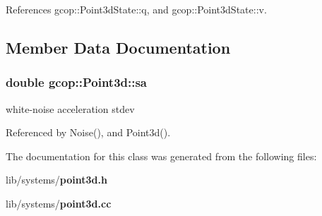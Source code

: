 \-References gcop\-::\-Point3d\-State\-::q, and gcop\-::\-Point3d\-State\-::v.



\subsection{\-Member \-Data \-Documentation}
\subsubsection[{sa}]{\setlength{\rightskip}{0pt plus 5cm}double {\bf gcop\-::\-Point3d\-::sa}}\label{classgcop_1_1Point3d_a5004631e9feecffc1882b02cdfe98a26}


white-\/noise acceleration stdev 



\-Referenced by \-Noise(), and \-Point3d().



\-The documentation for this class was generated from the following files\-:\begin{DoxyCompactItemize}
\item 
lib/systems/{\bf point3d.\-h}\item 
lib/systems/{\bf point3d.\-cc}\end{DoxyCompactItemize}
